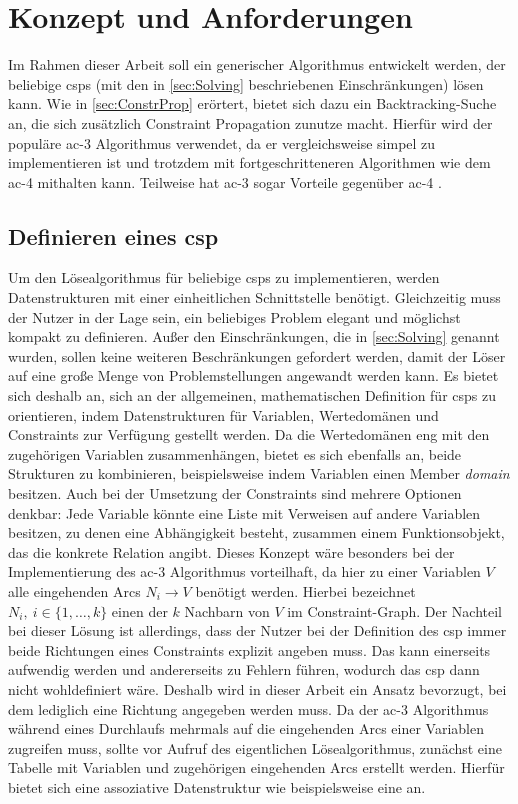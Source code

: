 \section{Konzept und Anforderungen}
\label{sec:Concept}
Im Rahmen dieser Arbeit soll ein generischer Algorithmus entwickelt werden, der beliebige \acp{csp} (mit den in \cref{sec:Solving} beschriebenen Einschränkungen) lösen kann. Wie in
\cref{sec:ConstrProp} erörtert, bietet sich dazu ein Backtracking-Suche an, die sich zusätzlich Constraint Propagation zunutze macht. Hierfür wird der populäre \ac*{ac}-3
Algorithmus verwendet, da er vergleichsweise simpel zu implementieren ist und trotzdem mit fortgeschritteneren Algorithmen wie dem \ac*{ac}-4 mithalten kann. Teilweise hat
\ac*{ac}-3 sogar Vorteile gegenüber \ac*{ac}-4 \cite{ACAgain}.

\subsection{Definieren eines \ac*{csp}}
\label{sec:CSPDef}
Um den Lösealgorithmus für beliebige \acp{csp} zu implementieren, werden Datenstrukturen mit einer einheitlichen Schnittstelle benötigt. Gleichzeitig muss der Nutzer in der Lage
sein, ein beliebiges Problem elegant und möglichst kompakt zu definieren. Außer den Einschränkungen, die in \cref{sec:Solving} genannt wurden, sollen keine weiteren Beschränkungen
gefordert werden, damit der Löser auf eine große Menge von Problemstellungen angewandt werden kann. Es bietet sich deshalb an, sich an der allgemeinen, mathematischen Definition
für \acp{csp} zu orientieren, indem Datenstrukturen für Variablen, Wertedomänen und Constraints zur Verfügung gestellt werden. Da die Wertedomänen eng mit den zugehörigen Variablen
zusammenhängen, bietet es sich ebenfalls an, beide Strukturen zu kombinieren, beispielsweise indem Variablen einen Member \textit{domain} besitzen. Auch bei der Umsetzung der
Constraints sind mehrere Optionen denkbar: Jede Variable könnte eine Liste mit Verweisen auf andere Variablen besitzen, zu denen eine Abhängigkeit besteht, zusammen einem
Funktionsobjekt, das die konkrete Relation angibt. Dieses Konzept wäre besonders bei der Implementierung des \ac*{ac}-3 Algorithmus vorteilhaft, da hier zu einer Variablen $V$ alle
eingehenden Arcs $N_i \rightarrow V$ benötigt werden. Hierbei bezeichnet $N_i, \ i \in \{1, \dots, k\}$ einen der $k$ Nachbarn von $V$ im Constraint-Graph. Der Nachteil bei dieser
Lösung ist allerdings, dass der Nutzer bei der Definition des \ac*{csp} immer beide Richtungen eines Constraints explizit angeben muss. Das kann einerseits aufwendig werden und
andererseits zu Fehlern führen, wodurch das \ac*{csp} dann nicht wohldefiniert wäre. Deshalb wird in dieser Arbeit ein Ansatz bevorzugt, bei dem lediglich eine Richtung angegeben
werden muss. Da der \ac*{ac}-3 Algorithmus während eines Durchlaufs mehrmals auf die eingehenden Arcs einer Variablen zugreifen muss, sollte vor Aufruf des eigentlichen
Lösealgorithmus, zunächst eine Tabelle mit Variablen und zugehörigen eingehenden Arcs erstellt werden. Hierfür bietet sich eine assoziative Datenstruktur wie beispielsweise eine
 an.

